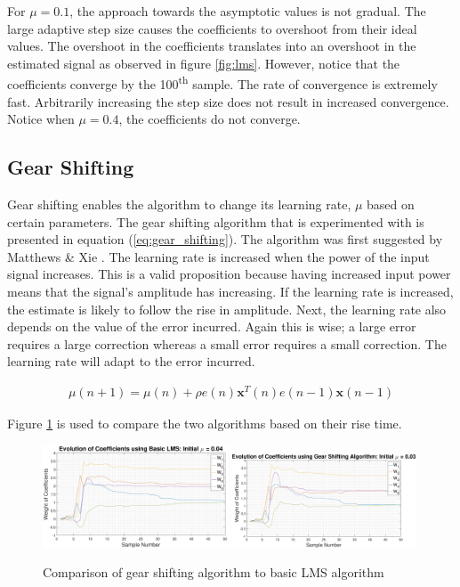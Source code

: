 \documentclass{article}
\begin{document}
For $\mu=0.1$, the approach towards the asymptotic values is not gradual. The large adaptive step size causes the coefficients to overshoot from their ideal values. The overshoot in the coefficients translates into an overshoot in the estimated signal as observed in figure \ref{fig:lms}. However, notice that the coefficients converge by the 100\textsuperscript{th} sample. The rate of convergence is extremely fast. Arbitrarily increasing the step size does not result in increased convergence. Notice when $\mu = 0.4$, the coefficients do not converge.

\newpage
\subsection{Gear Shifting}
Gear shifting enables the algorithm to change its learning rate, $\mu$ based on certain parameters. The gear shifting algorithm that is experimented with is presented in equation (\ref{eq:gear_shifting}). The algorithm was first suggested by Matthews \& Xie \cite{matt}. The learning rate is increased when the power of the input signal increases. This is a valid proposition because having increased input power means that the signal's amplitude has increasing. If the learning rate is increased, the estimate is likely to follow the rise in amplitude. Next, the learning rate also depends on the value of the error incurred. Again this is wise; a large error requires a large correction whereas a small error requires a small correction. The learning rate will adapt to the error incurred. 

\begin{align}
    \mu(n+1) = \mu(n) + \rho e(n)\textbf{x}^{T}(n)e(n-1)\textbf{x}(n-1)\label{eq:gear_shifting}
\end{align}


Figure \ref{fig:gear_shifting} is used to compare the two algorithms based on their rise time. 

\begin{figure}[H]
    \centering
    \includegraphics[width=0.49\textwidth]{basic_lms}
    \includegraphics[width=0.49\textwidth]{gear_shifting}
    \caption{Comparison of gear shifting algorithm to basic LMS algorithm}
    \label{fig:gear_shifting}
\end{figure}
\end{document}
